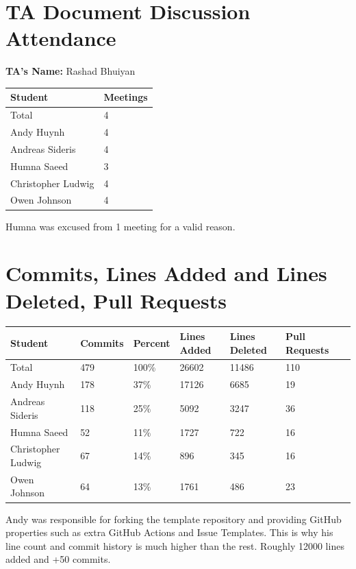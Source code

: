 \documentclass{article}
\begin{document}
\section{TA Document Discussion Attendance}

\noindent \textbf{TA's Name: }Rashad Bhuiyan

\begin{table}[H]
\centering
\begin{tabular}{ll}
\toprule
\textbf{Student} & \textbf{Meetings}\\
\midrule
Total & 4\\
Andy Huynh  & 4\\
Andreas Sideris & 4\\
Humna Saeed & 3\\
Christopher Ludwig & 4\\
Owen Johnson & 4\\
\bottomrule
\end{tabular}
\end{table}

Humna was excused from 1 meeting for a valid reason.

\section{Commits, Lines Added and Lines Deleted, Pull Requests}

\begin{table}[H]
\centering
\begin{tabular}{lllllll}
\toprule
\textbf{Student} & \textbf{Commits} & \textbf{Percent} & \textbf{Lines Added} &
\textbf{Lines Deleted} & \textbf{Pull Requests}\\
\midrule
Total & 479 & 100\% & 26602 & 11486 & 110\\
Andy Huynh & 178 & 37\% & 17126 & 6685 & 19\\
Andreas Sideris & 118 & 25\% & 5092 & 3247 & 36\\
Humna Saeed & 52 & 11\% & 1727 & 722 & 16\\
Christopher Ludwig & 67 & 14\% & 896 & 345 & 16\\
Owen Johnson & 64 & 13\% & 1761 & 486 & 23\\
\bottomrule
\end{tabular}
\end{table}
Andy was responsible for forking the template repository and providing GitHub 
properties such as extra GitHub Actions and Issue Templates. This is why his line 
count and commit history is much higher than the rest. Roughly 12000 lines added and +50 commits. 
\end{document}
